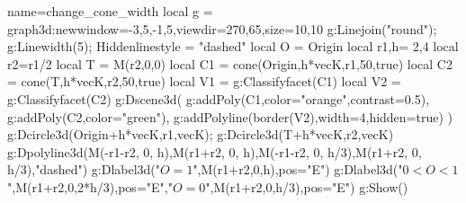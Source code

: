 \documentclass[border=2pt]{standalone}%
\begin{document}
\begin{luadraw}{name=change_cone_width}
local g = graph3d:new{window={-3,5,-1,5},viewdir={270,65},size={10,10}}
g:Linejoin("round"); g:Linewidth(5);  Hiddenlinestyle = "dashed"
local O = Origin
local r1,h= 2,4
local r2=r1/2
local T =  M(r2,0,0)
local C1 = cone(Origin,h*vecK,r1,50,true)
local C2 = cone(T,h*vecK,r2,50,true)
local V1 = g:Classifyfacet(C1)
local V2 = g:Classifyfacet(C2)
g:Dscene3d(
    g:addPoly(C1,{color="orange",contrast=0.5}), 
    g:addPoly(C2,{color="green"}),
    g:addPolyline(border(V2),{width=4,hidden=true})
    )
g:Dcircle3d(Origin+h*vecK,r1,vecK); g:Dcircle3d(T+h*vecK,r2,vecK)
g:Dpolyline3d({{M(-r1-r2, 0, h),M(r1+r2, 0, h)},{M(-r1-r2, 0, h/3),M(r1+r2, 0, h/3)}},"dashed")    
g:Dlabel3d("$O=1$",M(r1+r2,0,h),{pos="E"})
g:Dlabel3d("$0<O<1$",M(r1+r2,0,2*h/3),{pos="E"},"$O=0$",M(r1+r2,0,h/3),{pos="E"})
g:Show()
\end{luadraw}
\end{document}
